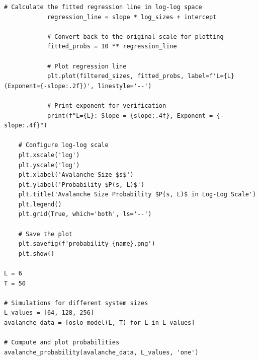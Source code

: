 \documentclass[10pt,letterpaper, onecolumn]{report}
\begin{document}
\begin{flushleft}
\begin{enumerate}
\begin{lstlisting}[style=myPythonStyle, caption={Oslo Model Algorithm (Python version 3.11.7)}]
            # Calculate the fitted regression line in log-log space
            regression_line = slope * log_sizes + intercept

            # Convert back to the original scale for plotting
            fitted_probs = 10 ** regression_line

            # Plot regression line
            plt.plot(filtered_sizes, fitted_probs, label=f'L={L} (Exponent={-slope:.2f})', linestyle='--')

            # Print exponent for verification
            print(f"L={L}: Slope = {slope:.4f}, Exponent = {-slope:.4f}")

    # Configure log-log scale
    plt.xscale('log')
    plt.yscale('log')
    plt.xlabel('Avalanche Size $s$')
    plt.ylabel('Probability $P(s, L)$')
    plt.title('Avalanche Size Probability $P(s, L)$ in Log-Log Scale')
    plt.legend()
    plt.grid(True, which='both', ls='--')

    # Save the plot
    plt.savefig(f'probability_{name}.png')
    plt.show()

L = 6
T = 50

# Simulations for different system sizes
L_values = [64, 128, 256]
avalanche_data = [oslo_model(L, T) for L in L_values]

# Compute and plot probabilities
avalanche_probability(avalanche_data, L_values, 'one')
            \end{lstlisting}
            \clearpage


\end{enumerate}
\end{flushleft}
\end{document}
